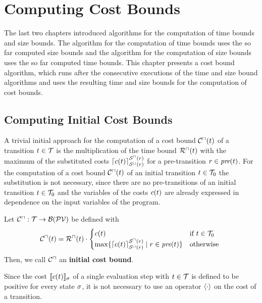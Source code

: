 \section{Computing Cost Bounds}

The last two chapters introduced algorithms for the computation of time bounds and size bounds.
The algorithm for the computation of time bounds uses the so far computed size bounds and the algorithm for the computation of size bounds uses the so far computed time bounds.
This chapter presents a cost bound algorithm, which runs after the consecutive executions of the time and size bound algorithms and uses the resulting time and size bounds for the computation of cost bounds.

\subsection{Computing Initial Cost Bounds}

A trivial initial approach for the computation of a cost bound ${\mathcal{C}^\sqcap}(t)$ of a transition $t \in \mathcal{T}$ is the multiplication of the time bound ${\mathcal{R}^\sqcap}(t)$ with the maximum of the substituted costs $\lceil c(t) \rceil^{{\mathcal{S}^\sqcap}(r)}_{{\mathcal{S}^\sqcup}(r)}$ for a pre-transition $r \in \emph{pre}(t)$.
For the computation of a cost bound ${\mathcal{C}^\sqcap}(t)$ of an initial transition $t \in \mathcal{T}_0$ the substitution is not necessary, since there are no pre-transitions of an initial transition $t \in \mathcal{T}_0$ and the variables of the costs $c(t)$ are already expressed in dependence on the input variables of the program.

\begin{definition}
  Let ${\mathcal{C}^\sqcap}: \mathcal{T} \rightarrow \mathcal{B}(\mathcal{PV})$ be defined with
  \[ {\mathcal{C}^\sqcap}(t) = {\mathcal{R}^\sqcap}(t) \cdot
  \begin{cases}
    c(t) & \text{if } t \in \mathcal{T}_0 \\
    \max \lbrace \lceil c(t) \rceil^{{\mathcal{S}^\sqcap}(r)}_{{\mathcal{S}^\sqcup}(r)} \mid r \in \emph{pre}(t) \rbrace & \text{otherwise }
  \end{cases}
  \]
  Then, we call ${\mathcal{C}^\sqcap}$ an \textbf{initial cost bound}. 
\end{definition}

Since the cost $\llbracket c(t) \rrbracket_{\sigma}$ of a single evaluation step with $t \in \mathcal{T}$ is defined to be positive for every state $\sigma$, it is not necessary to use an operator $\langle\cdot\rangle$ on the cost of a transition.

